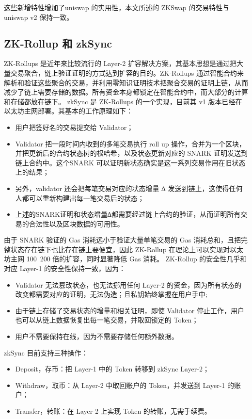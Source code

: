 \documentclass[]{template/llncs}
\begin{document}
这些新增特性增加了uniswap 的实用性，本文所述的 ZKSwap 的交易特性与 uniswap v2 保持一致。

\subsection{ZK-Rollup 和 zkSync}
ZK-Rollups 是近年来比较流行的 Layer-2 扩容解决方案，其基本思想是通过把大量交易聚合，链上验证证明的方式达到扩容的目的。ZK-Rollups 通过智能合约来解析和验证这些聚合的交易，并利用零知识证明技术把聚合交易的证明上链，从而减少了链上需要存储的数据。所有资金本身都锁定在智能合约中，而大部分的计算和存储都放在链下。
zkSync\cite{zksync} 是 ZK-Rollups 的一个实现，目前其 v1 版本已经在以太坊主网部署。其基本的工作原理如下：
\begin{itemize}
	\item 用户把签好名的交易提交给 Validator；
	\item Validator 把一段时间内收到的多笔交易执行 roll up 操作，合并为一个区块，并把更新后的合约状态树的根哈希，以及状态更新对应的 SNARK 证明发送到链上合约中。这个SNARK 可以证明新状态确实是这一系列交易作用在旧状态上的结果；
	\item 另外，validator 还会把每笔交易对应的状态增量 ∆ 发送到链上，这使得任何人都可以重新构建出每一笔交易后的状态；
	\item 上述的SNARK证明和状态增量∆都需要经过链上合约的验证，从而证明所有交易的合法性以及区块数据的可用性。
\end{itemize}

由于 SNARK 验证的 Gas 消耗远小于验证大量单笔交易的 Gas 消耗总和，且把完整状态存在链下也比存在链上要便宜，因此 ZK-Rollup 在理论上可以实现对以太坊主网 100~200 倍的扩容，同时显著降低 Gas 消耗。
ZK-Rollup 的安全性几乎和对应 Layer-1 的安全性保持一致，因为：

\begin{itemize}
	\item Validator 无法篡改状态，也无法挪用任何 Layer-2 的资金，因为所有状态的改变都需要对应的证明，无法伪造；且私钥始终掌握在用户手中;
	\item 由于链上存储了交易状态的增量和相关证明，即使 Validator 停止工作，用户也可以从链上数据恢复出每一笔交易，并取回锁定的 Token；
	\item 用户不需要保持在线，因为不需要存储任何额外数据。
\end{itemize}

zkSync 目前支持三种操作：

\begin{itemize}
	\item Deposit，存币：把 Layer-1 中的 Token 转移到 zkSync Layer-2；
	\item Withdraw，取币：从 Layer-2 中取回账户的 Token，并发送到 Layer-1 的账户；
	\item Transfer，转账：在 Layer-2 上实现 Token 的转账，无需手续费。
\end{itemize}
\end{document}
